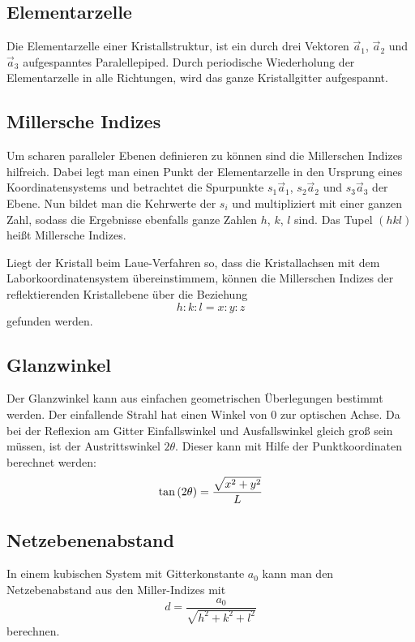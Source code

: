 \subsection{Elementarzelle}

Die Elementarzelle einer Kristallstruktur, ist ein durch drei Vektoren
$\vec a_1$, $\vec a_2$ und $\vec a_3$ aufgespanntes Paralellepiped. Durch
periodische Wiederholung der Elementarzelle in alle Richtungen, wird das
ganze Kristallgitter aufgespannt.

\subsection{Millersche Indizes}

Um scharen paralleler Ebenen definieren zu können sind die Millerschen
Indizes hilfreich. Dabei legt man einen Punkt der Elementarzelle in den
Ursprung eines Koordinatensystems und betrachtet die Spurpunkte $s_1\vec
a_1$, $s_2\vec a_2$ und $s_3\vec a_3$ der Ebene. Nun bildet man die
Kehrwerte der $s_i$ und multipliziert mit einer ganzen Zahl, sodass die
Ergebnisse ebenfalls ganze Zahlen $h$, $k$, $l$ sind. Das Tupel $(hkl)$
heißt Millersche Indizes.

Liegt der Kristall beim Laue-Verfahren so, dass die Kristallachsen mit dem
Laborkoordinatensystem übereinstimmem, können die Millerschen Indizes der
reflektierenden Kristallebene über die Beziehung
\[
    h:k:l = x:y:z
\]
gefunden werden.

\subsection{Glanzwinkel}

Der Glanzwinkel kann aus einfachen geometrischen Überlegungen bestimmt
werden. Der einfallende Strahl hat einen Winkel von 0 zur optischen Achse. 
Da bei der Reflexion am Gitter Einfallswinkel und Ausfallswinkel gleich
groß sein müssen, ist der Austrittswinkel $2\theta$. Dieser kann mit Hilfe
der Punktkoordinaten berechnet werden:
\[
    \tan\del{2\theta} = \frac{\sqrt{x^2+y^2}}{L}
\]

\subsection{Netzebenenabstand}

In einem kubischen System mit Gitterkonstante $a_0$ kann man den
Netzebenabstand aus den Miller-Indizes mit
\[
    d = \frac {a_0} {\sqrt{ h^2 + k^2 + l^2}}
\]
berechnen. \parencite[Vorlesung~3]{physics613-Vorlesung}

